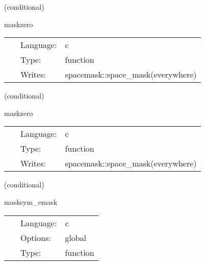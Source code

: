 \documentclass{article}
\begin{document}
\vspace{5mm}

   (conditional) 

\hspace{5mm} maskzero 

\hspace{5mm}{\it initialise mask to zero } 


\hspace{5mm}

 \begin{tabular*}{160mm}{cll} 
~ & Language:  & c \\ 
~ & Type:  & function \\ 
~ & Writes:  & spacemask::space\_mask(everywhere) \\ 
\end{tabular*} 


\vspace{5mm}

   (conditional) 

\hspace{5mm} maskzero 

\hspace{5mm}{\it initialise mask to zero } 


\hspace{5mm}

 \begin{tabular*}{160mm}{cll} 
~ & Language:  & c \\ 
~ & Type:  & function \\ 
~ & Writes:  & spacemask::space\_mask(everywhere) \\ 
\end{tabular*} 


\vspace{5mm}

   (conditional) 

\hspace{5mm} masksym\_emask 

\hspace{5mm}{\it set grid symmetries for emask (compatibility mode) } 


\hspace{5mm}

 \begin{tabular*}{160mm}{cll} 
~ & Language:  & c \\ 
~ & Options:  & global \\ 
~ & Type:  & function \\ 
\end{tabular*} 
\end{document}
